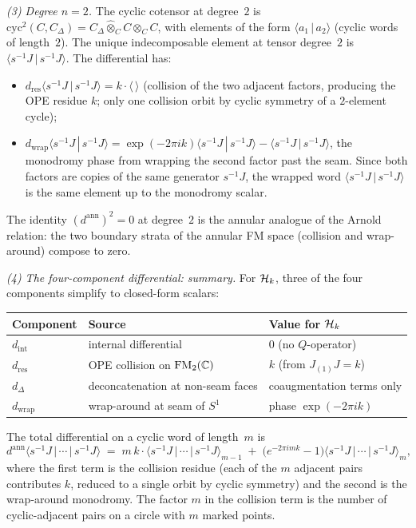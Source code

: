 \begin{computation}
\smallskip
\noindent
\emph{(3) Degree $n=2$.}
The cyclic cotensor at degree~$2$ is
$\mathrm{cyc}^2(C,C_\Delta) = C_\Delta \widehat\otimes_C C
\widehat\otimes_C C$,
with elements of the form
$\langle a_1\,|\,a_2\rangle$ (cyclic words of length~$2$).
The unique indecomposable element at tensor degree~$2$ is
$\langle s^{-1}J\,|\,s^{-1}J\rangle$.
The differential has:
\begin{itemize}
\item $d_{\mathrm{res}}\langle s^{-1}J\,|\,s^{-1}J\rangle
 = k \cdot \langle\,\rangle$
 (collision of the two adjacent factors, producing the
 OPE residue $k$; only one collision orbit by cyclic
 symmetry of a $2$-element cycle);
\item $d_{\mathrm{wrap}}\langle s^{-1}J\,|\,s^{-1}J\rangle
 = \exp(-2\pi i k)\langle s^{-1}J\,|\,s^{-1}J\rangle
 - \langle s^{-1}J\,|\,s^{-1}J\rangle$,
 the monodromy phase from wrapping the second factor past
 the seam. Since both factors are copies of the same
 generator $s^{-1}J$, the wrapped word
 $\langle s^{-1}J\,|\,s^{-1}J\rangle$ is the
 same element up to the monodromy scalar.
\end{itemize}
The identity $(d^{\mathrm{ann}})^2 = 0$ at degree~$2$
is the annular analogue of the Arnold relation: the
two boundary strata of the annular FM space
(collision and wrap-around) compose to zero.

\smallskip
\noindent
\emph{(4) The four-component differential: summary.}
For $\mathcal{H}_k$, three of the four components simplify
to closed-form scalars:
\begin{center}
\small
\renewcommand{\arraystretch}{1.3}
\begin{tabular}{@{}l@{\;\;}l@{\;\;}l@{}}
\textbf{Component} & \textbf{Source} &
 \textbf{Value for $\mathcal{H}_k$} \\
\hline
$d_{\mathrm{int}}$
 & internal differential
 & $0$ (no $Q$-operator) \\[2pt]
$d_{\mathrm{res}}$
 & OPE collision on $\mathrm{FM}_2(\mathbb{C})$
 & $k$ (from $J_{(1)}J = k$) \\[2pt]
$d_\Delta$
 & deconcatenation at non-seam faces
 & coaugmentation terms only \\[2pt]
$d_{\mathrm{wrap}}$
 & wrap-around at seam of $S^1$
 & phase $\exp(-2\pi i k)$
\end{tabular}
\end{center}
The total differential on a cyclic word of length~$m$ is
\begin{equation}\label{eq:heisenberg-annular-total}
d^{\mathrm{ann}}\langle s^{-1}J\,|\,\cdots\,|\,s^{-1}J\rangle
\;=\;
m\,k\cdot
\langle s^{-1}J\,|\,\cdots\,|\,s^{-1}J\rangle_{m-1}
\;+\;
\bigl(e^{-2\pi i m k} - 1\bigr)
\langle s^{-1}J\,|\,\cdots\,|\,s^{-1}J\rangle_{m},
\end{equation}
where the first term is the collision residue
(each of the $m$ adjacent pairs contributes $k$,
reduced to a single orbit by cyclic symmetry)
and the second is the wrap-around monodromy.
The factor $m$ in the collision term is the number
of cyclic-adjacent pairs on a circle with $m$ marked
points.


\end{computation}
